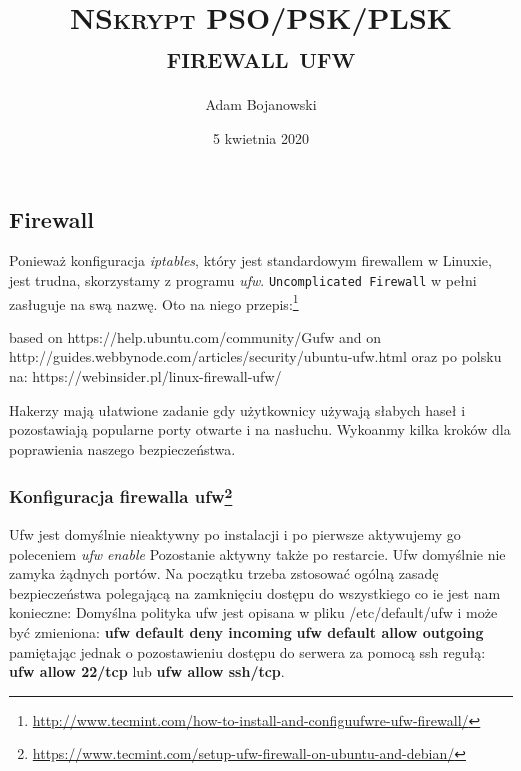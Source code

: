 \documentclass[a4paper,titlepage,12pt]{mwart}
\title{\textsc{\huge{NSkrypt PSO/PSK/PLSK firewall ufw}}}
\author{Adam Bojanowski}
\date{5 kwietnia 2020}
\begin{document}
\graphicspath{ {/home/navegante/SLES/} }
\subsection{Firewall}
	Ponieważ konfiguracja \textit{iptables}, który jest standardowym firewallem w Linuxie, jest trudna, skorzystamy z programu \textit{ufw}. \texttt{Uncomplicated Firewall} w pełni zasługuje na swą nazwę. Oto na niego przepis:\footnote{\url{http://www.tecmint.com/how-to-install-and-configuufwre-ufw-firewall/}}

	based on https://help.ubuntu.com/community/Gufw
	and on http://guides.webbynode.com/articles/security/ubuntu-ufw.html
	oraz po polsku na: https://webinsider.pl/linux-firewall-ufw/

	Hakerzy mają ułatwione zadanie gdy użytkownicy używają słabych haseł i pozostawiają popularne porty otwarte i na nasłuchu. Wykoanmy kilka kroków dla poprawienia naszego bezpieczeństwa.

\subsubsection{Konfiguracja firewalla ufw\footnote{\url{https://www.tecmint.com/setup-ufw-firewall-on-ubuntu-and-debian/}}}
Ufw jest domyślnie nieaktywny po instalacji i po pierwsze aktywujemy go poleceniem \textit{ufw enable}
Pozostanie aktywny także po restarcie.\newline
Ufw domyślnie nie zamyka żądnych portów. Na początku trzeba zstosować ogólną zasadę bezpieczeństwa polegającą na zamknięciu dostępu do wszystkiego co ie jest nam konieczne:
Domyślna polityka ufw jest opisana w pliku /etc/default/ufw i może być zmieniona:\newline
\textbf{ufw default deny incoming}
\textbf{ufw default allow outgoing}\newline
 pamiętając jednak o pozostawieniu dostępu do serwera za pomocą ssh regułą:
\textbf{ufw allow 22/tcp} lub \textbf{ufw allow ssh/tcp}.\newline
\end{document}
